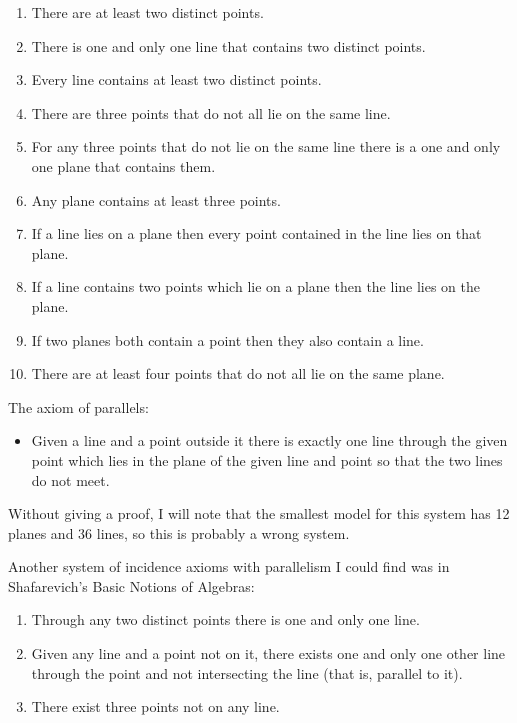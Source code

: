 \documentclass[11pt]{article}
\begin{document}
\begin{enumerate}
\item There are at least two distinct points.
\item There is one and only one line that contains two distinct points.
\item Every line contains at least two distinct points.
\item There are three points that do not all lie on the same line.
\item For any three points that do not lie on the same line there is 
a one and only one plane that contains them.
\item Any plane contains at least three points.
\item If a line lies on a plane then every point contained in the line 
lies on that plane.
\item If a line contains two points which lie on a plane then the line 
lies on the plane.
\item If two planes both contain a point then they also contain a line.
\item There are at least four points that do not all lie on the same plane.
\end{enumerate}

The axiom of parallels:

\begin{itemize}
\item Given a line and a point outside it there is exactly one line through the
given point which lies in the plane of the given line and point so that
the two lines do not meet.
\end{itemize}

Without giving a proof, I will note that the smallest model for this
system has 12 planes and 36 lines, so this is probably a wrong system.

Another system of incidence axioms with parallelism I could find was
in Shafarevich's Basic Notions of Algebras:

\begin{enumerate}
\item Through any two distinct points there is one and only one line.
\item Given any line and a point not on it, there exists one and only one
other line through the point and not intersecting the line (that is,
parallel to it).
\item There exist three points not on any line.
\end{enumerate}
\end{document}
